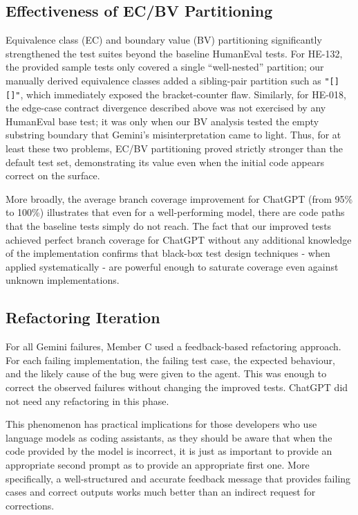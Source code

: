 \documentclass[journal]{IEEEtran}
\begin{document}
\subsection{Effectiveness of EC/BV Partitioning}
Equivalence class (EC) and boundary value (BV) partitioning significantly strengthened the test suites beyond the baseline HumanEval tests. For HE-132, the provided sample tests only covered a single ``well-nested'' partition; our manually derived equivalence classes added a sibling-pair partition such as \texttt{"[][]"}, which immediately exposed the bracket-counter flaw. Similarly, for HE-018, the edge-case contract divergence described above was not exercised by any HumanEval base test; it was only when our BV analysis tested the empty substring boundary that Gemini's misinterpretation came to light. Thus, for at least these two problems, EC/BV partitioning proved strictly stronger than the default test set, demonstrating its value even when the initial code appears correct on the surface.

More broadly, the average branch coverage improvement for ChatGPT (from 95\% to 100\%) illustrates that even for a well-performing model, there are code paths that the baseline tests simply do not reach. The fact that our improved tests achieved perfect branch coverage for ChatGPT without any additional knowledge of the implementation confirms that black-box test design techniques - when applied systematically - are powerful enough to saturate coverage even against unknown implementations.

\subsection{Refactoring Iteration}
For all Gemini failures, Member C used a feedback-based refactoring approach. For each failing implementation, the failing test case, the expected behaviour, and the likely cause of the bug were given to the agent. This was enough to correct the observed failures without changing the improved tests. ChatGPT did not need any refactoring in this phase.

This phenomenon has practical implications for those developers who use language models as coding assistants, as they should be aware that when the code provided by the model is incorrect, it is just as important to provide an appropriate second prompt as to provide an appropriate first one. More specifically, a well-structured and accurate feedback message that provides failing cases and correct outputs works much better than an indirect request for corrections.
\end{document}
